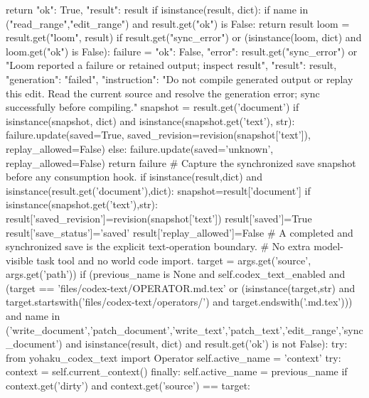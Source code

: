                 return {"ok": True, "result": result}
            if isinstance(result, dict):
                if name in ("read_range","edit_range") and result.get("ok") is False:
                    return result
                loom = result.get("loom", result)
                if result.get("sync_error") or (isinstance(loom, dict) and loom.get("ok") is False):
                    failure = {"ok": False, "error": result.get("sync_error") or "Loom reported a failure or retained output; inspect result",
                               "result": result, "generation": "failed",
                               "instruction": "Do not compile generated output or replay this edit. Read the current source and resolve the generation error; sync successfully before compiling."}
                    snapshot = result.get('document')
                    if isinstance(snapshot, dict) and isinstance(snapshot.get('text'), str):
                        failure.update(saved=True, saved_revision=revision(snapshot['text']), replay_allowed=False)
                    else:
                        failure.update(saved='unknown', replay_allowed=False)
                    return failure
            # Capture the synchronized save snapshot before any consumption hook.
            if isinstance(result,dict) and isinstance(result.get('document'),dict):
                snapshot=result['document']
                if isinstance(snapshot.get('text'),str):
                    result['saved_revision']=revision(snapshot['text'])
                    result['saved']=True
                    result['save_status']='saved'
                    result['replay_allowed']=False
            # A completed and synchronized save is the explicit text-operation boundary.
            # No extra model-visible task tool and no world code import.
            target = args.get('source', args.get('path'))
            if (previous_name is None and self.codex_text_enabled and (target == 'files/codex-text/OPERATOR.md.tex' or (isinstance(target,str) and target.startswith('files/codex-text/operators/') and target.endswith('.md.tex')))
                    and name in ('write_document','patch_document','write_text','patch_text','edit_range','sync_document')
                    and isinstance(result, dict) and result.get('ok') is not False):
                try:
                    from yohaku_codex_text import Operator
                    self.active_name = 'context'
                    try: context = self.current_context()
                    finally: self.active_name = previous_name
                    if context.get('dirty') and context.get('source') == target:
